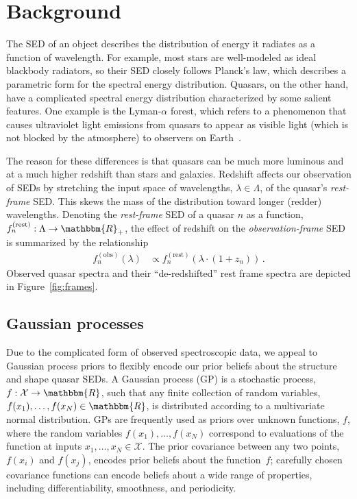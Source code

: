 \documentclass{article}
\newcommand{\R}{\mathbbm{R}}
\newcommand{\mcX}{\mathcal{X}}
\begin{document}
\section{Background}
\label{sec:background}
The SED of an object describes the distribution of energy it radiates as a function of wavelength.  
For example, most stars are well-modeled as ideal blackbody radiators, so their SED closely follows Planck's law, which describes a parametric form for the spectral energy distribution. 
Quasars, on the other hand, have a complicated spectral energy distribution characterized by some salient features. One example is the Lyman-$\alpha$ forest, which refers to a phenomenon that causes
ultraviolet light emissions from quasars to appear as visible light (which is not blocked by
the atmosphere) to observers on Earth~\cite{weinberg2003lymanalpha}.

The reason for these differences is that quasars can be much more luminous and at a much higher redshift than stars and galaxies.  
Redshift affects our observation of SEDs by stretching the input space of wavelengths, $\lambda \in \Lambda$, of the quasar's \emph{rest-frame} SED.  
This skews the mass of the distribution toward longer (redder) wavelengths. Denoting the \emph{rest-frame} SED of a quasar $n$ as a function, $f_n^{(\text{rest})} : \Lambda \rightarrow \R_+$, the effect of redshift on the \emph{observation-frame} SED is summarized by the relationship 
\begin{align}
  f_n^{(\text{obs})}(\lambda) &\propto f_n^{(\text{rest})}(\lambda \cdot (1 + z_n)) \, .
\end{align}
Observed quasar spectra and their ``de-redshifted'' rest frame spectra are depicted in Figure~\ref{fig:frames}.

\subsection{Gaussian processes}
Due to the complicated form of observed spectroscopic data, we appeal to Gaussian process priors to flexibly encode our prior beliefs about the structure and shape quasar SEDs. 
A Gaussian process (GP) is a stochastic process, $f: \mathcal{X} \rightarrow \R$, such that any finite collection of random variables, ${f(x_1),\dots, f(x_N) \in \R}$, is distributed according to a multivariate normal distribution.  
GPs are frequently used as priors over unknown functions, $f$, where the random variables $f(x_1), \dots, f(x_N)$ correspond to evaluations of the function at inputs $x_1, \dots, x_N \in \mcX$.  
The prior covariance between any two points, $f(x_i)$ and $f(x_j)$, encodes prior beliefs about the function~$f$; carefully chosen covariance functions can encode beliefs about a wide range of properties, including differentiability, smoothness, and periodicity.  
\end{document}
